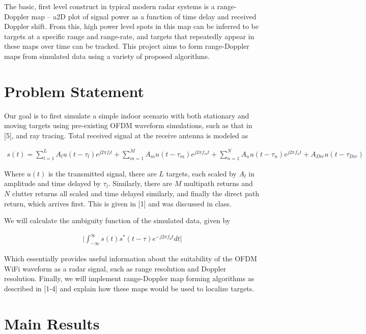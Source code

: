\documentclass[article,11pt,onecolumn,final]{IEEEtran}
\begin{document}
The basic, first level construct in typical modern radar systems is a range-Doppler map – a2D plot of
signal power as a function of time delay and received Doppler shift. From this, high power level spots in
this map can be inferred to be targets at a specific range and range-rate, and targets that repeatedly
appear in these maps over time can be tracked. This project aims to form range-Doppler maps from
simulated data using a variety of proposed algorithms.

\section{Problem Statement} 
Our goal is to first simulate a simple indoor scenario with both stationary and moving targets using 
pre-existing OFDM waveform simulations, such as that in [5], and ray tracing. Total received signal at the
receive antenna is modeled as

\begin{align*}
 s(t) = \sum_{l=1}^L A_l u(t-\tau_l)e^{j 2 \pi f_l t} + \sum_{m=1}^M A_m u(t-\tau_m)e^{j 2\pi f_m t} +
        \sum_{n=1}^N A_n u(t-\tau_n)e^{j 2 \pi f_n t} + A_{Dir} u(t-\tau_{Dir})
\end{align*}

Where $u(t)$ is the transmitted signal, there are $L$ targets, each scaled by $A_l$ in amplitude and time
delayed by $\tau_l$. Similarly, there are $M$ multipath returns and $N$ clutter returns all scaled and time delayed
similarly, and finally the direct path return, which arrives first. This is given in [1] and was discussed in
class.

We will calculate the ambiguity function of the simulated data, given by

\begin{align*}
\big|\int_{-\infty}^{\infty} s(t)s^*(t-\tau)e^{-j2\pi f_d t}dt \big|
\end{align*}

Which essentially provides useful information about the suitability of the OFDM WiFi waveform as a
radar signal, such as range resolution and Doppler resolution. Finally, we will implement range-Doppler
map forming algorithms as described in [1-4] and explain how these maps would be used to localize
targets.


\section{Main Results}
\end{document}
